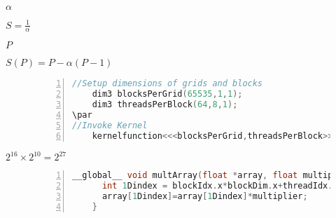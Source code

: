 {{\begin{figure}
\end{figure}%
\lthtmlfigureZ
\lthtmlcheckvsize\clearpage}

{\newpage\clearpage
{}%
$ \alpha$%
\lthtmlinlinemathZ
\lthtmlcheckvsize\clearpage}

{\newpage\clearpage
{}%
$\displaystyle S=\frac{1}{\alpha}$%
\lthtmlindisplaymathZ
\lthtmlcheckvsize\clearpage}

{\newpage\clearpage
{}%
$ P$%
\lthtmlinlinemathZ
\lthtmlcheckvsize\clearpage}

{\newpage\clearpage
{}%
$\displaystyle S(P)=P-\alpha(P-1)$%
\lthtmlindisplaymathZ
\lthtmlcheckvsize\clearpage}

{\newpage\clearpage
{}%
\begin{figure}  \centering
    \begin{lstlisting}[numbers=left, language=C, numberstyle=\tiny , numbersep=8pt]
    //Setup dimensions of grids and blocks
    dim3 blocksPerGrid(65535,1,1);
    dim3 threadsPerBlock(64,8,1);
\par
//Invoke Kernel
    kernelfunction<<<blocksPerGrid,threadsPerBlock>>>(*functionarguments);
    \end{lstlisting}
  
\end{figure}%
\lthtmlfigureZ
\lthtmlcheckvsize\clearpage}

{\newpage\clearpage
{}%
$ 2^{16}\times 2^{10} = 2^{27}$%
\lthtmlinlinemathZ
\lthtmlcheckvsize\clearpage}

{\newpage\clearpage
{}%
\begin{figure}  \centering
    \begin{lstlisting}[numbers=left, language=C, numberstyle=\tiny , numbersep=8pt]
    __global__ void multArray(float *array, float multiplier){
      int 1Dindex = blockIdx.x*blockDim.x+threadIdx.x;
      array[1Dindex]=array[1Dindex]*multiplier;
    }
    \end{lstlisting}
  
\end{figure}%
\lthtmlfigureZ
\lthtmlcheckvsize\clearpage}

}
